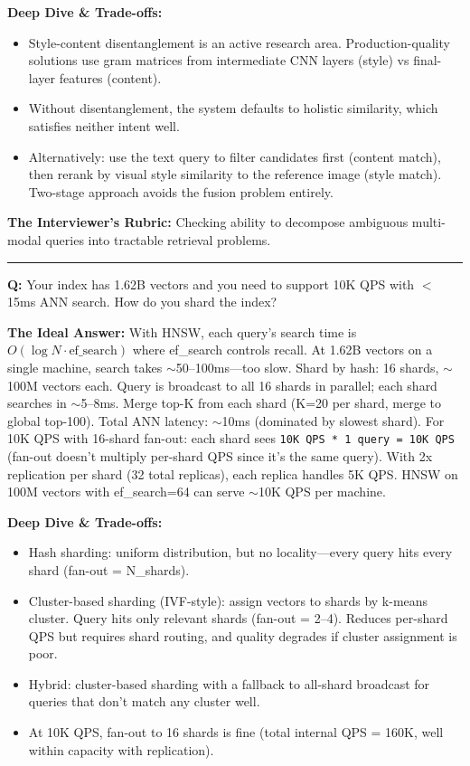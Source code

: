 \textbf{Deep Dive \& Trade-offs:}
\begin{itemize}
  \item Style-content disentanglement is an active research area. Production-quality solutions use gram matrices from intermediate CNN layers (style) vs final-layer features (content).
  \item Without disentanglement, the system defaults to holistic similarity, which satisfies neither intent well.
  \item Alternatively: use the text query to filter candidates first (content match), then rerank by visual style similarity to the reference image (style match). Two-stage approach avoids the fusion problem entirely.
\end{itemize}

\textbf{The Interviewer's Rubric:} Checking ability to decompose ambiguous multi-modal queries into tractable retrieval problems.

\bigskip\hrule\bigskip

\textbf{Q:} Your index has 1.62B vectors and you need to support 10K QPS with $<$ 15ms ANN search. How do you shard the index?

\textbf{The Ideal Answer:} With HNSW, each query's search time is $O(\log N \cdot \text{ef\_search})$ where ef\_search controls recall. At 1.62B vectors on a single machine, search takes $\sim$50--100ms---too slow. Shard by hash: 16 shards, $\sim$100M vectors each. Query is broadcast to all 16 shards in parallel; each shard searches in $\sim$5--8ms. Merge top-K from each shard (K=20 per shard, merge to global top-100). Total ANN latency: $\sim$10ms (dominated by slowest shard). For 10K QPS with 16-shard fan-out: each shard sees \texttt{10K QPS * 1 query = 10K QPS} (fan-out doesn't multiply per-shard QPS since it's the same query). With 2x replication per shard (32 total replicas), each replica handles 5K QPS. HNSW on 100M vectors with ef\_search=64 can serve $\sim$10K QPS per machine.

\textbf{Deep Dive \& Trade-offs:}
\begin{itemize}
  \item Hash sharding: uniform distribution, but no locality---every query hits every shard (fan-out = N\_shards).
  \item Cluster-based sharding (IVF-style): assign vectors to shards by k-means cluster. Query hits only relevant shards (fan-out = 2--4). Reduces per-shard QPS but requires shard routing, and quality degrades if cluster assignment is poor.
  \item Hybrid: cluster-based sharding with a fallback to all-shard broadcast for queries that don't match any cluster well.
  \item At 10K QPS, fan-out to 16 shards is fine (total internal QPS = 160K, well within capacity with replication).
\end{itemize}

